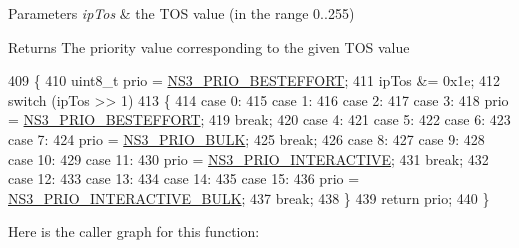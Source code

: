 \begin{DoxyParams}{Parameters}
{\em ip\+Tos} & the T\+OS value (in the range 0..255) \\
\hline
\end{DoxyParams}
\begin{DoxyReturn}{Returns}
The priority value corresponding to the given T\+OS value 
\end{DoxyReturn}

\begin{DoxyCode}
409 \{
410   uint8\_t prio = \hyperlink{classns3_1_1Socket_a9b12adffe479408a899f1ad9b5cfbb1ba1786dc9cad2f4cbf61f26e63ff8f1993}{NS3\_PRIO\_BESTEFFORT};
411   ipTos &= 0x1e;
412   \textcolor{keywordflow}{switch} (ipTos >> 1)
413     \{
414     \textcolor{keywordflow}{case} 0:
415     \textcolor{keywordflow}{case} 1:
416     \textcolor{keywordflow}{case} 2:
417     \textcolor{keywordflow}{case} 3:
418       prio = \hyperlink{classns3_1_1Socket_a9b12adffe479408a899f1ad9b5cfbb1ba1786dc9cad2f4cbf61f26e63ff8f1993}{NS3\_PRIO\_BESTEFFORT};
419       \textcolor{keywordflow}{break};
420     \textcolor{keywordflow}{case} 4:
421     \textcolor{keywordflow}{case} 5:
422     \textcolor{keywordflow}{case} 6:
423     \textcolor{keywordflow}{case} 7:
424       prio = \hyperlink{classns3_1_1Socket_a9b12adffe479408a899f1ad9b5cfbb1ba0c05c3b71dddd8a77f9aabb3c54c581f}{NS3\_PRIO\_BULK};
425       \textcolor{keywordflow}{break};
426     \textcolor{keywordflow}{case} 8:
427     \textcolor{keywordflow}{case} 9:
428     \textcolor{keywordflow}{case} 10:
429     \textcolor{keywordflow}{case} 11:
430       prio = \hyperlink{classns3_1_1Socket_a9b12adffe479408a899f1ad9b5cfbb1ba3a7e3bd56aa4fd29a973ce3a22e35ff8}{NS3\_PRIO\_INTERACTIVE};
431       \textcolor{keywordflow}{break};
432     \textcolor{keywordflow}{case} 12:
433     \textcolor{keywordflow}{case} 13:
434     \textcolor{keywordflow}{case} 14:
435     \textcolor{keywordflow}{case} 15:
436       prio = \hyperlink{classns3_1_1Socket_a9b12adffe479408a899f1ad9b5cfbb1babe40af18f4db874a2b65e559045ffa9b}{NS3\_PRIO\_INTERACTIVE\_BULK};
437       \textcolor{keywordflow}{break};
438     \}
439   \textcolor{keywordflow}{return} prio;
440 \}
\end{DoxyCode}


Here is the caller graph for this function\+:


